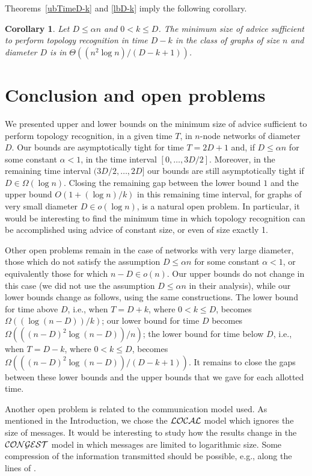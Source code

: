 \documentclass{article}
\newtheorem{corollary}{Corollary}[section]
\begin{document}
Theorems~\ref{ubTimeD-k} and \ref{lbD-k} imply the following corollary.
\begin{corollary}\label{corD-k}
Let $D\le \alpha n$  and $0 < k \le  D$.
The minimum size of advice sufficient to perform topology recognition in time $D-k$ in the class of graphs of size $n$ and diameter $D$
is in $\Theta((n^2\log n)/(D-k+1))$.
\end{corollary}


\section{Conclusion and open problems}
We presented upper and lower bounds on the minimum size of advice sufficient to perform topology recognition, in a given time $T$, in $n$-node networks of diameter $D$. 
Our bounds are asymptotically tight for time $T=2D+1$ and, if $D\le \alpha n$ for some constant $\alpha<1$, in the time interval $[0, \ldots , 3D/2]$.
Moreover, in the remaining time interval $(3D/2, \ldots, 2D]$ our bounds are still asymptotically tight if $D\in \Omega(\log n)$.
Closing the remaining gap between the lower bound $1$ and the upper bound $O(1+(\log n)/k)$ in this remaining time interval, for graphs of very small diameter $D \in o(\log n)$, is a natural open problem. In particular, it would be interesting to find the minimum time in which topology recognition can be accomplished using advice of constant size, or even of size exactly 1.

Other open problems remain in the case of networks with very large diameter, those which do not satisfy the assumption $D\le \alpha n$ for some constant $\alpha <1$, or equivalently those for which $n-D \in o(n)$.
Our upper bounds do not change in this case (we did not use the assumption $D\le \alpha n$ in their analysis), while our lower bounds change as follows, using the same constructions.
The lower bound for time above $D$, i.e., when $T=D+k$, where $0<k\le D$, becomes $\Omega((\log(n-D))/k)$;
our lower bound for time $D$ becomes $\Omega(((n-D)^2\log(n-D))/n)$;
the lower bound for time below $D$, i.e., when $T=D-k$, where $0<k\le D$, becomes $\Omega(((n-D)^2\log(n-D))/(D-k+1))$. It remains to close the gaps between these lower bounds and the upper bounds that we gave for each allotted time.

Another open problem is related to the communication model used. As mentioned in the Introduction, we chose the $\cal LOCAL$ model which ignores the size of messages. It would be interesting to 
study how the results change in the $\cal CONGEST$ model in which messages are limited to logarithmic size. Some compression of the information transmitted should be possible, e.g., along the lines of \cite{Ta}.
\end{document}
